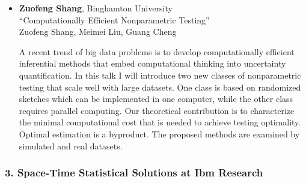 \begin{itemize}
\item \textbf{Zuofeng Shang}, Binghamton University \\
``Computationally Efficient Nonparametric Testing'' \\
Zuofeng Shang, Meimei Liu, Guang Cheng


A recent trend of big data problems is to develop computationally efficient inferential methods that embed computational thinking into uncertainty quantification. In this talk I will introduce two new classes of nonparametric testing that scale well with large datasets. One class is based on randomized sketches which can be implemented in one computer, while the other class requires parallel computing. Our theoretical contribution is to characterize the minimal computational cost that is needed to achieve testing optimality. Optimal estimation is a byproduct. The proposed methods are examined by simulated and real datasets.

\end{itemize}

\subsubsection*{3. Space-Time Statistical Solutions at Ibm Research}

